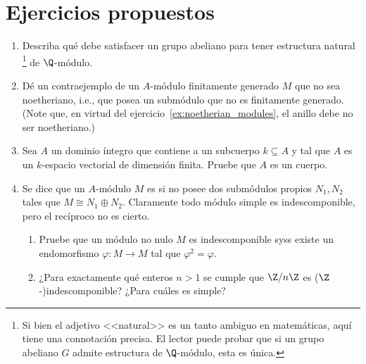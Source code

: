 \documentclass[11pt, reqno]{amsart}
\begin{document}

\appendix
\section{Ejercicios propuestos}
\begin{enumerate}
	\item Describa qué debe satisfacer un grupo abeliano para tener estructura natural%
		\footnote{Si bien el adjetivo <<natural>> es un tanto ambiguo en matemáticas, aquí tiene una connotación
		precisa. El lector puede probar que si un grupo abeliano $G$ admite estructura de $\Q$-módulo, esta es única.}
		de $\Q$-módulo.

	\item\lookup
		Dé un contraejemplo de un $A$-módulo finitamente generado $M$ que no sea noetheriano, i.e., que posea un
		submódulo que no es finitamente generado.
		(Note que, en virtud del ejercicio~\ref{ex:noetherian_modules}, el anillo debe no ser noetheriano.)

	\item Sea $A$ un dominio íntegro que contiene a un subcuerpo $k \subseteq A$ y tal que $A$ es un $k$-espacio
		vectorial de dimensión finita.
		Pruebe que $A$ es un cuerpo.

	\item Se dice que un $A$-módulo $M$ es  si no posee dos submódulos propios $N_1, N_2$
		tales que $M \cong N_1 \oplus N_2$.
		Claramente todo módulo simple es indescomponible, pero el recíproco no es cierto.
		\begin{enumerate}
			\item Pruebe que un módulo no nulo $M$ es indescomponible syss existe un endomorfismo $\varphi
				\colon M \to M$ tal que $\varphi^2 = \varphi$.
			\item ¿Para exactamente qué enteros $n > 1$ se cumple que $\Z/n\Z$ es ($\Z$-)indescomponible?
				¿Para cuáles es simple?
		\end{enumerate}


\end{enumerate}
\end{document}
